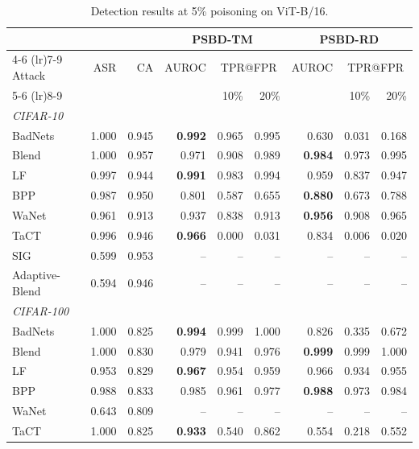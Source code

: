 \begin{table}[htbp]
\centering
\small
\setlength{\tabcolsep}{4pt}
\caption{Detection results at 5\% poisoning on ViT-B/16.}
\label{tab:results-rate-5}
\begin{tabular}{lrrrrrrrr}
\toprule
 & & & \multicolumn{3}{c}{PSBD-TM} & \multicolumn{3}{c}{PSBD-RD} \\
\cmidrule(lr){4-6} \cmidrule(lr){7-9}
Attack & ASR & CA & AUROC & \multicolumn{2}{c}{TPR@FPR} & AUROC & \multicolumn{2}{c}{TPR@FPR} \\
\cmidrule(lr){5-6} \cmidrule(lr){8-9}
 & & & & 10\% & 20\% & & 10\% & 20\% \\
\midrule
\multicolumn{9}{l}{\textit{CIFAR-10}} \\
BadNets & 1.000 & 0.945 & \textbf{0.992} & 0.965 & 0.995 & 0.630 & 0.031 & 0.168 \\
Blend & 1.000 & 0.957 & 0.971 & 0.908 & 0.989 & \textbf{0.984} & 0.973 & 0.995 \\
LF & 0.997 & 0.944 & \textbf{0.991} & 0.983 & 0.994 & 0.959 & 0.837 & 0.947 \\
BPP & 0.987 & 0.950 & 0.801 & 0.587 & 0.655 & \textbf{0.880} & 0.673 & 0.788 \\
WaNet & 0.961 & 0.913 & 0.937 & 0.838 & 0.913 & \textbf{0.956} & 0.908 & 0.965 \\
TaCT & 0.996 & 0.946 & \textbf{0.966} & 0.000 & 0.031 & 0.834 & 0.006 & 0.020 \\
SIG & 0.599 & 0.953 & -- & -- & -- & -- & -- & -- \\
Adaptive-Blend & 0.594 & 0.946 & -- & -- & -- & -- & -- & -- \\
\midrule
\multicolumn{9}{l}{\textit{CIFAR-100}} \\
BadNets & 1.000 & 0.825 & \textbf{0.994} & 0.999 & 1.000 & 0.826 & 0.335 & 0.672 \\
Blend & 1.000 & 0.830 & 0.979 & 0.941 & 0.976 & \textbf{0.999} & 0.999 & 1.000 \\
LF & 0.953 & 0.829 & \textbf{0.967} & 0.954 & 0.959 & 0.966 & 0.934 & 0.955 \\
BPP & 0.988 & 0.833 & 0.985 & 0.961 & 0.977 & \textbf{0.988} & 0.973 & 0.984 \\
WaNet & 0.643 & 0.809 & -- & -- & -- & -- & -- & -- \\
TaCT & 1.000 & 0.825 & \textbf{0.933} & 0.540 & 0.862 & 0.554 & 0.218 & 0.552 \\

\end{tabular}
\end{table}
